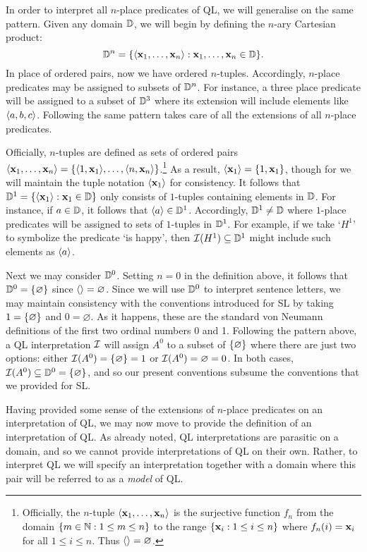 In order to interpret all $n$-place predicates of QL, we will generalise on the same pattern.
Given any domain $\mathbb{D}$, we will begin by defining the $n$-ary Cartesian product: 
  $$ \mathbb{D}^n = \lbrace\langle\mathbf{x}_1,\ldots,\mathbf{x}_n\rangle:\mathbf{x}_1,\ldots,\mathbf{x}_n\in\mathbb{D}\rbrace.$$ %
In place of ordered pairs, now we have ordered $n$-tuples.
Accordingly, $n$-place predicates may be assigned to subsets of $\mathbb{D}^n$.
For instance, a three place predicate will be assigned to a subset of $\mathbb{D}^3$ where its extension will include elements like $\langle a,b,c\rangle$.
Following the same pattern takes care of all the extensions of all $n$-place predicates.

Officially, $n$-tuples are defined as sets of ordered pairs $\langle\mathbf{x}_1,\ldots,\mathbf{x}_n\rangle=\lbrace\langle1,\mathbf{x}_1\rangle,\ldots,\langle n,\mathbf{x}_n\rangle\rbrace$.\footnote{Officially, the $n$-tuple $\langle\mathbf{x}_1,\ldots,\mathbf{x}_n\rangle$ is the surjective function $f_n$ from the domain $\lbrace m\in\mathbb{N}:1\leq m\leq n\rbrace$ to the range $\lbrace\mathbf{x}_i:1\leq i\leq n\rbrace$ where $f_n(i)=\mathbf{x}_i$ for all $1\leq i\leq n$. Thus $\langle\rangle=\varnothing$.}
As a result, $\langle\mathbf{x}_1\rangle=\lbrace1,\mathbf{x}_1\rbrace$, though for we will maintain the tuple notation $\langle\mathbf{x}_1\rangle$ for consistency.
It follows that $\mathbb{D}^1=\lbrace\langle\mathbf{x}_1\rangle:\mathbf{x}_1\in\mathbb{D}\rbrace$ only consists of $1$-tuples containing elements in $\mathbb{D}$.
For instance, if $a\in \mathbb{D}$, it follows that $\langle a\rangle\in\mathbb{D}^1$.
Accordingly, $\mathbb{D}^1\neq\mathbb{D}$ where $1$-place predicates will be assigned to sets of $1$-tuples in $\mathbb{D}^1$.
For example, if we take `$H^1$' to symbolize the predicate `is happy', then $\mathcal{I}(H^1)\subseteq\mathbb{D}^1$ might include such elements as $\langle a\rangle$.

Next we may consider $\mathbb{D}^0$. 
Setting $n=0$ in the definition above, it follows that $\mathbb{D}^0=\lbrace\varnothing\rbrace$ since $\langle\rangle=\varnothing$.
Since we will use $\mathbb{D}^0$ to interpret sentence letters, we may maintain consistency with the conventions introduced for SL by taking $1=\lbrace\varnothing\rbrace$ and $0=\varnothing$.
As it happens, these are the standard von Neumann definitions of the first two ordinal numbers 0 and 1.
Following the pattern above, a QL interpretation $\mathcal{I}$ will assign $A^0$ to a subset of $\lbrace\varnothing\rbrace$ where there are just two options: either $\mathcal{I}(A^0)=\lbrace\varnothing\rbrace=1$ or $\mathcal{I}(A^0)=\varnothing=0$.
In both cases, $\mathcal{I}(A^0)\subseteq\mathbb{D}^0=\lbrace\varnothing\rbrace$, and so our present conventions subsume the conventions that we provided for SL.

Having provided some sense of the extensions of $n$-place predicates on an interpretation of QL, we may now move to provide the definition of an interpretation of QL.
As already noted, QL interpretations are parasitic on a domain, and so we cannot provide interpretations of QL on their own.
Rather, to interpret QL we will specify an interpretation together with a domain where this pair will be referred to as a \textit{model} of QL.


